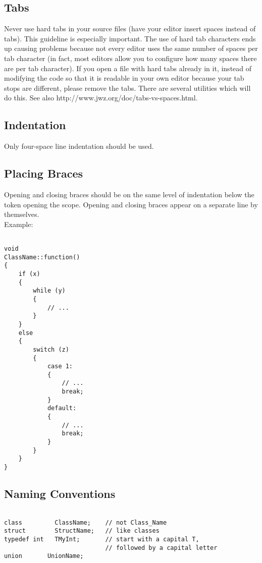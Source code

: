\subsection{Tabs}

Never use hard tabs in your source files (have your editor insert spaces instead of tabs). 
This guideline is especially important. The use of hard tab characters ends up causing 
problems because not every editor uses the same number of spaces per tab character 
(in fact, most editors allow you to configure how many spaces there are per tab character). 
If you open a file with hard tabs already in it, instead of modifying the code so that 
it is readable in your own editor because your tab stops are different, 
please remove the tabs. There are several utilities which will do this. 
See also http://www.jwz.org/doc/tabs-vs-spaces.html.

\subsection{Indentation}

Only four-space line indentation should be used. 

\subsection{Placing Braces}

Opening and closing braces should be on the same level of
indentation below the token opening the scope. Opening and closing
braces appear on a separate line by themselves.
\\

Example:
\begin{verbatim}

void
ClassName::function()
{
    if (x)
    {
        while (y)
        {
            // ...
        }
    }
    else
    {
        switch (z)
        {
            case 1:
            {
                // ...
                break;
            }
            default:
            {
                // ...
                break;
            }
        }
    }
}

\end{verbatim}

\subsection{Naming Conventions}

\begin{verbatim}

class         ClassName;    // not Class_Name 
struct        StructName;   // like classes
typedef int   TMyInt;       // start with a capital T, 
                            // followed by a capital letter
union		UnionName;    

\end{verbatim}

